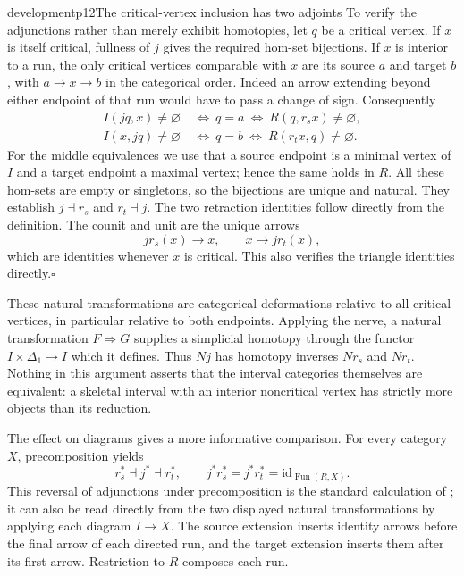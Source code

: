 \begin{dcomment}{development}{p12}{The critical-vertex inclusion has two adjoints}
To verify the adjunctions rather than merely exhibit homotopies, let $q$ be a critical vertex. If $x$ is itself critical, fullness of $j$ gives the required hom-set bijections. If $x$ is interior to a run, the only critical vertices comparable with $x$ are its source $a$ and target $b$, with $a\to x\to b$ in the categorical order. Indeed an arrow extending beyond either endpoint of that run would have to pass a change of sign. Consequently
\[
\begin{split}
 I(jq,x)\ne\varnothing&\ \Longleftrightarrow\ q=a
     \ \Longleftrightarrow\ R(q,r_sx)\ne\varnothing,\\
 I(x,jq)\ne\varnothing&\ \Longleftrightarrow\ q=b
     \ \Longleftrightarrow\ R(r_tx,q)\ne\varnothing.
\end{split}
\]
For the middle equivalences we use that a source endpoint is a minimal vertex of $I$ and a target endpoint a maximal vertex; hence the same holds in $R$. All these hom-sets are empty or singletons, so the bijections are unique and natural. They establish $j\dashv r_s$ and $r_t\dashv j$. The two retraction identities follow directly from the definition. The counit and unit are the unique arrows
\[
 j r_s(x)\longrightarrow x,\qquad x\longrightarrow j r_t(x),
\]
which are identities whenever $x$ is critical. This also verifies the triangle identities directly.\hfill$\square$

These natural transformations are categorical deformations relative to all critical vertices, in particular relative to both endpoints. Applying the nerve, a natural transformation $F\Rightarrow G$ supplies a simplicial homotopy through the functor $I\times\Delta_1\to I$ which it defines. Thus $Nj$ has homotopy inverses $Nr_s$ and $Nr_t$. Nothing in this argument asserts that the interval categories themselves are equivalent: a skeletal interval with an interior noncritical vertex has strictly more objects than its reduction.

The effect on diagrams gives a more informative comparison. For every category $X$, precomposition yields
\[
 r_s^*\dashv j^*\dashv r_t^*,\qquad
 j^*r_s^*=j^*r_t^*=\mathrm{id}_{\operatorname{Fun}(R,X)}.
\]
This reversal of adjunctions under precomposition is the standard calculation of \citet[Proposition~4.3.7]{Riehl2016}; it can also be read directly from the two displayed natural transformations by applying each diagram $I\to X$. The source extension inserts identity arrows before the final arrow of each directed run, and the target extension inserts them after its first arrow. Restriction to $R$ composes each run.


\end{dcomment}

